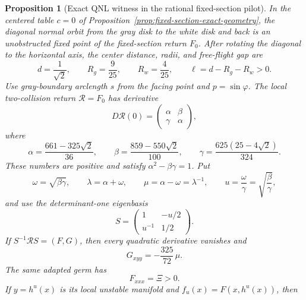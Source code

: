 \documentclass[11pt]{article}
\newtheorem{proposition}[theorem]{Proposition}
\begin{document}
\begin{proposition}[Exact QNL witness in the rational fixed-section pilot]
\label{prop:fixed-section-exact-qnl-witness}
In the centered table $c=0$ of
Proposition~\ref{prop:fixed-section-exact-geometry}, the diagonal normal
orbit from the gray disk to the white disk and back is an unobstructed fixed
point of the fixed-section return $F_0$.  After rotating the diagonal to the
horizontal axis, the center distance, radii, and free-flight gap are
\[
 d=\frac1{\sqrt2},\qquad
 R_g=\frac9{25},\qquad R_w=\frac4{25},\qquad
 \ell=d-R_g-R_w>0.
\]
Use gray-boundary arclength $s$ from the facing point and
$p=\sin\varphi$.  The local two-collision return
$\mathcal R=F_0$ has derivative
\begin{equation}
\label{eq:fixed-section-pilot-linear-return}
 D\mathcal R(0)=
 \begin{pmatrix}\alpha&\beta\\ \gamma&\alpha\end{pmatrix},
\end{equation}
where
\begin{equation}
\label{eq:fixed-section-pilot-linear-coefficients}
 \alpha=\frac{661-325\sqrt2}{36},\qquad
 \beta=\frac{859-550\sqrt2}{100},\qquad
 \gamma=\frac{625(25-4\sqrt2)}{324}.
\end{equation}
These numbers are positive and satisfy
$\alpha^2-\beta\gamma=1$.  Put
\[
 \omega=\sqrt{\beta\gamma},\qquad
 \lambda=\alpha+\omega,\qquad
 \mu=\alpha-\omega=\lambda^{-1},\qquad
 u=\frac{\omega}{\gamma}=\sqrt{\frac\beta\gamma},
\]
and use the determinant-one eigenbasis
\begin{equation}
\label{eq:fixed-section-pilot-eigenbasis}
 S=\begin{pmatrix}1&-u/2\\ u^{-1}&1/2\end{pmatrix}.
\end{equation}
If $S^{-1}\mathcal RS=(F,G)$, then every quadratic derivative vanishes and
\begin{equation}
\label{eq:fixed-section-pilot-cubic-witness}
 G_{xyy}=-\frac{325}{72}\,\mu.
\end{equation}
The same adapted germ has
\begin{equation}
\label{eq:fixed-section-pilot-unstable-cubic}
 F_{xxx}=\Xi>0.
\end{equation}
If $y=h^u(x)$ is its local unstable manifold and
$f_u(x)=F(x,h^u(x))$, then
\begin{equation}
\label{eq:fixed-section-pilot-log-distortion-seed}

\end{equation}
\end{proposition}
\end{document}
